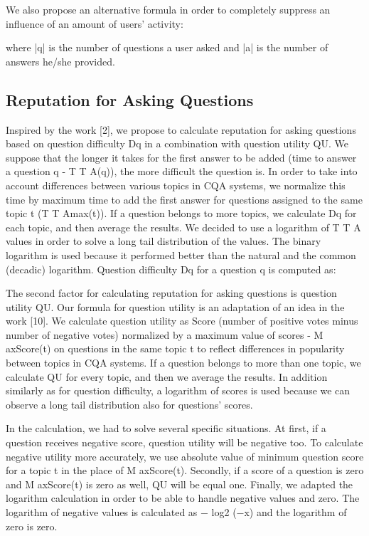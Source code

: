 \documentclass{llncs}
\begin{document}
			
			
			
			
			We also propose an alternative formula in order to completely suppress an
			influence of an amount of users’ activity:




			where |q| is the number of questions a user asked and |a| is the number of answers
			he/she provided.
			
		\subsection{Reputation for Asking Questions}
		
			Inspired by the work [2], we propose to calculate reputation for asking questions
			based on question difficulty Dq in a combination with question utility QU. We
			suppose that the longer it takes for the first answer to be added (time to answer
			a question q - T T A(q)), the more difficult the question is. In order to take into
			account differences between various topics in CQA systems, we normalize this
			time by maximum time to add the first answer for questions assigned to the
			same topic t (T T Amax(t)). If a question belongs to more topics, we calculate Dq
			for each topic, and then average the results. We decided to use a logarithm of
			T T A values in order to solve a long tail distribution of the values. The binary
			logarithm is used because it performed better than the natural and the common
			(decadic) logarithm. Question difficulty Dq for a question q is computed as:
			
			
			
			
			
			
			The second factor for calculating reputation for asking questions is question
			utility QU. Our formula for question utility is an adaptation of an idea in
			the work [10]. We calculate question utility as Score (number of positive votes
			minus number of negative votes) normalized by a maximum value of scores -
			M axScore(t) on questions in the same topic t to reflect differences in popularity
			between topics in CQA systems. If a question belongs to more than one topic,
			we calculate QU for every topic, and then we average the results. In addition
			similarly as for question difficulty, a logarithm of scores is used because we can
			observe a long tail distribution also for questions’ scores.




			In the calculation, we had to solve several specific situations. At first, if a
			question receives negative score, question utility will be negative too. To calculate
			negative utility more accurately, we use absolute value of minimum question
			score for a topic t in the place of M axScore(t). Secondly, if a score of a question
			is zero and M axScore(t) is zero as well, QU will be equal one. Finally, we
			adapted the logarithm calculation in order to be able to handle negative values
			and zero. The logarithm of negative values is calculated as − log2
			(−x) and the
			logarithm of zero is zero.
			
\end{document}
